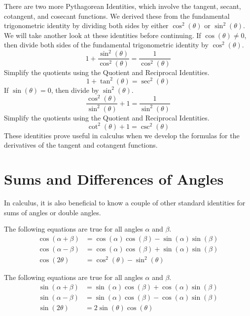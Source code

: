 \documentclass{ximera}
\begin{document}
There are two more Pythagorean Identities, which involve the tangent, secant, cotangent, and cosecant functions.
We derived these from the fundamental trigonometric identity by dividing both sides by either \( \cos^2(\theta) \) or \( \sin^2(\theta) \).
We will take another look at these identities before continuing.
If \( \cos(\theta) \ne 0 \), then divide both sides of the fundamental trigonometric identity by \( \cos^2(\theta) \).
\[
  1 + \frac{\sin^2(\theta)}{\cos^2(\theta)} = \frac{1}{\cos^2(\theta)}
\]
Simplify the quotients using the Quotient and Reciprocal Identities.
\[
  \boxed{1 + \tan^2(\theta) = \sec^2(\theta)}
\]
If \( \sin(\theta) = 0 \), then divide by \( \sin^2(\theta) \).
\[
  \frac{\cos^2(\theta)}{\sin^2(\theta)} + 1 = \frac{1}{\sin^2(\theta)}
\]
Simplify the quotients using the Quotient and Reciprocal Identities.
\[
  \boxed{\cot^2(\theta) + 1 = \csc^2(\theta)}
\]
These identities prove useful in calculus when we develop the formulas for the derivatives of the tangent and cotangent functions.



\section{Sums and Differences of Angles}

In calculus, it is also beneficial to know a couple of other standard identities for sums of angles or double angles.

\begin{callout}
  The following equations are true for all angles \( \alpha \) and \( \beta \).
\begin{align*}
  \cos(\alpha + \beta) &= \cos(\alpha)\cos(\beta) - \sin(\alpha)\sin(\beta)\tag{Angle Sum Formula} \\
  \cos(\alpha - \beta) &= \cos(\alpha)\cos(\beta) + \sin(\alpha)\sin(\beta)\tag{Angle Difference Formula} \\
   \cos(2\theta) &= \cos^2(\theta) - \sin^2(\theta)\tag{Double Angle Formula}
\end{align*}
\end{callout}

\begin{callout}
  The following equations are true for all angles \( \alpha \) and  \( \beta \).
\begin{align*}
  \sin(\alpha + \beta) &= \sin(\alpha)\cos(\beta) + \cos(\alpha)\sin(\beta)\tag{Angle Sum Formula}\\
  \sin(\alpha - \beta) &= \sin(\alpha)\cos(\beta) - \cos(\alpha)\sin(\beta)\tag{Angle Difference Formula} \\
  \sin(2\theta) &= 2\sin(\theta)\cos(\theta)\tag{Double Angle Formula}
\end{align*}
\end{callout}
\end{document}
